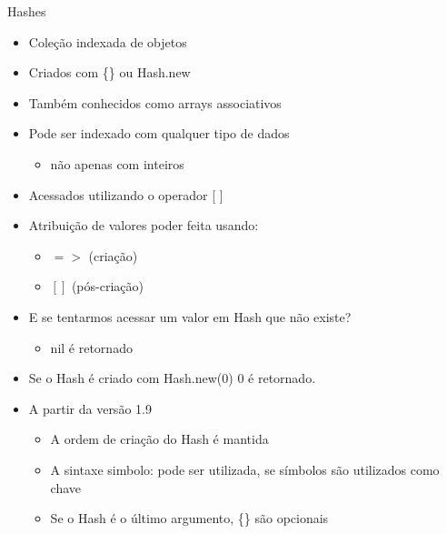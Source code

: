 
\begin{frame}{Hashes}
  \begin{itemize}
    \item \alert{Coleção indexada} de objetos
    \item Criados com \{\} ou \alert{Hash.new}
    \item Também conhecidos como \alert{arrays associativos}
    \item Pode ser indexado com \alert{qualquer} tipo de dados
    \begin{itemize}
      \item não apenas com \alert{inteiros}
    \end{itemize}
    \item Acessados utilizando o operador \alert{[ ]}
    \item Atribuição de valores poder feita usando:
    \begin{itemize}
      \item \alert{$=>$} (criação)
      \item \alert{$[  ]$} (pós-criação)
    \end{itemize}
  \end{itemize}
  
  
\pagebreak
  \begin{itemize}
    \item E se tentarmos \alert{acessar} um valor em Hash que \alert{não existe}?
    \begin{itemize}
      \item \alert{nil} é retornado
    \end{itemize}
    \item Se o Hash é criado com \alert{Hash.new(0)} 0 é retornado.
  \end{itemize}  
  
  
  
\pagebreak
  \begin{itemize}
    \item A partir da versão 1.9
    \begin{itemize}
      \item A ordem de criação do Hash é \alert{mantida}
      \item A sintaxe \alert{simbolo:} pode ser utilizada, se símbolos são utilizados como chave
      \item Se o Hash é o \alert{último argumento}, \{\} são opcionais
    \end{itemize}
  \end{itemize}  
  
  

\end{frame}

